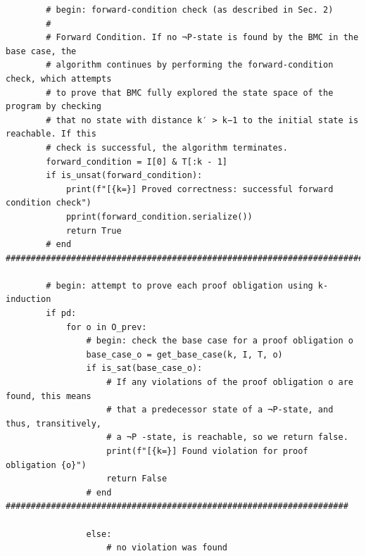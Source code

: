 \documentclass[11pt,a4paper]{report}%
\newenvironment{code}{\captionsetup{type=listing}}{}
\begin{document}
\begin{code}
\begin{verbatim}
        # begin: forward-condition check (as described in Sec. 2)
        #
        # Forward Condition. If no ¬P-state is found by the BMC in the base case, the
        # algorithm continues by performing the forward-condition check, which attempts
        # to prove that BMC fully explored the state space of the program by checking
        # that no state with distance k′ > k−1 to the initial state is reachable. If this
        # check is successful, the algorithm terminates.
        forward_condition = I[0] & T[:k - 1]
        if is_unsat(forward_condition):
            print(f"[{k=}] Proved correctness: successful forward condition check")
            pprint(forward_condition.serialize())
            return True
        # end ############################################################################

        # begin: attempt to prove each proof obligation using k-induction
        if pd:
            for o in O_prev:
                # begin: check the base case for a proof obligation o
                base_case_o = get_base_case(k, I, T, o)
                if is_sat(base_case_o):
                    # If any violations of the proof obligation o are found, this means
                    # that a predecessor state of a ¬P-state, and thus, transitively,
                    # a ¬P -state, is reachable, so we return false.
                    print(f"[{k=}] Found violation for proof obligation {o}")
                    return False
                # end ####################################################################

                else:
                    # no violation was found


\end{verbatim}
\end{code}
\end{document}
